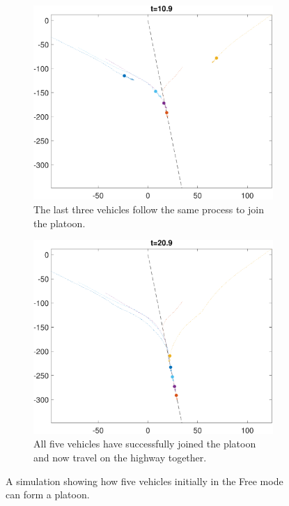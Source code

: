 \begin{figure}[h!]
    \begin{subfigure}[t]{0.9\columnwidth} \label{subfig:fp_110}
        \includegraphics[width=\columnwidth]{fp_110}
        \caption{The last three vehicles follow the same process to join the platoon.}
    \end{subfigure}
    \begin{subfigure}[t]{0.9\columnwidth} \label{subfig:fp_210}
        \includegraphics[width=\columnwidth]{fp_210}
        \caption{All five vehicles have successfully joined the platoon and now travel on the highway together.}
    \end{subfigure}   
    \caption{A simulation showing how five vehicles initially in the Free mode can form a platoon. \label{fig:fp}}
\end{figure}

